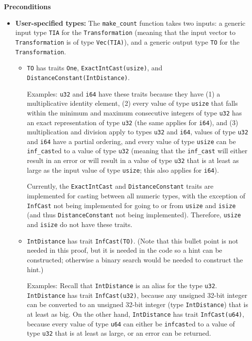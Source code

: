 \documentclass[11pt,letterpaper]{article}
\theoremstyle{definition}
\begin{document}
\textbf{Preconditions}
\begin{itemize}
    \item \textbf{User-specified types:} The \texttt{make\_count} function takes two inputs: a generic input type \texttt{TIA} for the \texttt{Transformation} (meaning that the input vector to \texttt{Transformation} is of type \texttt{Vec(TIA)}), and a generic output type \texttt{TO} for the \texttt{Transformation}.
    
    \begin{itemize}
        \item \texttt{TO} has traits \texttt{One}, \texttt{ExactIntCast(usize)}, and \texttt{DistanceConstant(IntDistance)}.
        
        Examples: \texttt{u32} and \texttt{i64} have these traits because they have (1) a multiplicative identity element, (2) every value of type \texttt{usize} that falls within the minimum and maximum consecutive integers of type \texttt{u32} has an exact representation of type \texttt{u32} (the same applies for \texttt{i64}), and (3) multiplication and division apply to types \texttt{u32} and \texttt{i64}, values of type \texttt{u32} and \texttt{i64} have a partial ordering, and every value of type \texttt{usize} can be \texttt{inf\_cast}ed to a value of type \texttt{u32} (meaning that the \texttt{inf\_cast} will either result in an error or will result in a value of type \texttt{u32} that is at least as large as the input value of type \texttt{usize}; this also applies for \texttt{i64}).
        
        Currently, the \texttt{ExactIntCast} and \texttt{DistanceConstant} traits are implemented for casting between all numeric types, with the exception of \texttt{InfCast} not being implemented for going to or from \texttt{usize} and \texttt{isize} (and thus \texttt{DistanceConstant} not being implemented). Therefore, \texttt{usize} and \texttt{isize} do not have these traits. 
        
        \item \texttt{IntDistance} has trait \texttt{InfCast(TO)}. (Note that this bullet point is not needed in this proof, but it is needed in the code so a hint can be constructed; otherwise a binary search would be needed to construct the hint.)
        
        Examples: Recall that \texttt{IntDistance} is an alias for the type \texttt{u32}. \texttt{IntDistance} has trait \texttt{InfCast(u32)}, because any unsigned 32-bit integer can be converted to an unsigned 32-bit integer (type \texttt{IntDistance}) that is at least as big. On the other hand, \texttt{IntDistance} has trait \texttt{InfCast(u64)}, because every value of type \texttt{u64} can either be \texttt{infcast}ed to a value of type \texttt{u32} that is at least as large, or an error can be returned.
        

\end{itemize}
\end{itemize}
\end{document}
